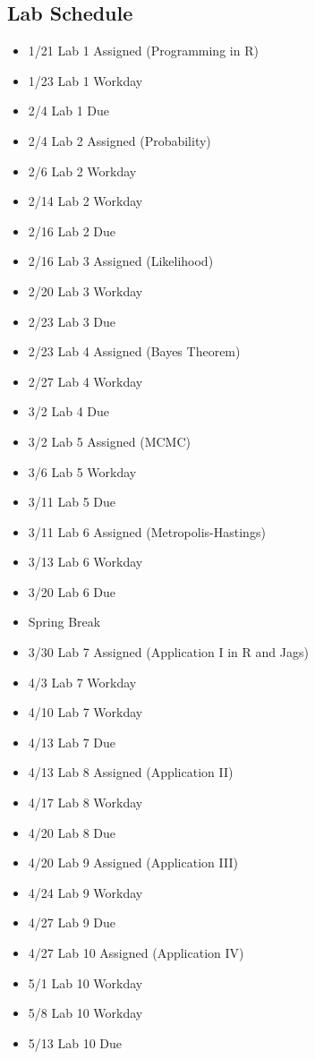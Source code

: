 \documentclass[11pt, a4paper]{article}
\begin{document}
\subsection*{Lab Schedule}
\begin{itemize}
\item 1/21 Lab 1 Assigned (Programming in R) 
\item 1/23 Lab 1 Workday
\item 2/4 Lab 1 Due

\item 2/4 Lab 2 Assigned (Probability)
\item 2/6 Lab 2 Workday
\item 2/14 Lab 2 Workday
\item 2/16 Lab 2 Due

\item 2/16 Lab 3 Assigned (Likelihood)
\item 2/20 Lab 3 Workday 
\item 2/23 Lab 3 Due

\item 2/23 Lab 4 Assigned (Bayes Theorem)
\item 2/27 Lab 4 Workday
\item 3/2 Lab 4 Due

\item 3/2 Lab 5 Assigned (MCMC)
\item 3/6 Lab 5 Workday
\item 3/11 Lab 5 Due

\item 3/11 Lab 6 Assigned (Metropolis-Hastings)
\item 3/13 Lab 6 Workday
\item 3/20 Lab 6 Due

\item Spring Break

\item 3/30 Lab 7 Assigned (Application I in R and Jags)
\item 4/3 Lab 7 Workday
\item 4/10 Lab 7 Workday
\item 4/13 Lab 7 Due

\item 4/13 Lab 8 Assigned (Application II)
\item 4/17 Lab 8 Workday
\item 4/20 Lab 8 Due

\item 4/20 Lab 9 Assigned (Application III)
\item 4/24 Lab 9 Workday
\item 4/27 Lab 9 Due
\item 4/27 Lab 10 Assigned (Application IV)
\item 5/1 Lab 10 Workday
\item 5/8 Lab 10 Workday
\item 5/13 Lab 10 Due









\end{itemize}
\end{document}
